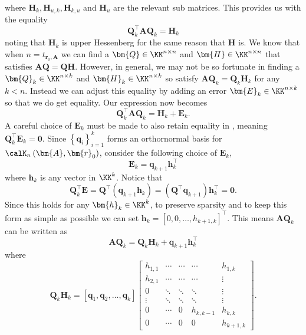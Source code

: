 where $\bm{H}_k , \bm{H}_{u,k}, \bm{H}_{k,u}$ and $\bm{H}_u$ are the relevant sub matrices. This provides us with the equality
\begin{equation}\label{eq: QTkAQk_eq_Hk}
    \bm{Q}_{k}^{\intercal} \bm{A} \bm{Q}_{k} = \bm{H}_k
\end{equation}
noting that $\bm{H}_{k}$ is upper Hessenberg for the same reason that $\bm{H}$ is. We know that when $n = t_{\bm{r}_0, \bm{A}}$ we can find a $\bm{Q} \in \KK^{n \times n}$ and $\bm{H} \in \KK^{n \times n}$ that satisfies $\bm{A} \bm{Q} = \bm{Q} \bm{H}$. However, in general, we may not be so fortunate in finding a $\bm{Q}_{k} \in \KK^{n \times k}$ and $\bm{H}_{k} \in \KK^{n \times k}$ so satisfy $\bm{A} \bm{Q}_{k} = \bm{Q}_{k} \bm{H}_k$ for any $k < n$. Instead we can adjust this equality by adding an error $\bm{E}_k \in \KK^{n \times k}$ so that we do get equality. Our expression now becomes
\begin{equation}\label{eq: QTkAQk_eq_HkEk}
    \bm{Q}_{k}^{\intercal} \bm{A} \bm{Q}_{k} = \bm{H}_k + \bm{E}_k.
\end{equation}
A careful choice of $\bm{E}_k$ must be made to also retain equality in , meaning $\bm{Q}_{k}^{\intercal} \bm{E}_k = \bm{0}$. Since $\left\{ \bm{q}_i \right\}_{i=1}^{k}$ forms an orthornormal basis for $\calK_{n} \left( \bm{A}, \bm{r}_0 \right)$, consider the following choice of $\bm{E}_k$,
\[
    \bm{E}_k = \bm{q}_{k+1} \bm{h}_{k}^{\intercal}
\]
where $\bm{h}_k$ is any vector in $\KK^{k}$. Notice that
\[
    \bm{Q}_{k}^{\intercal} \bm{E} = \bm{Q}^{\intercal} \left( \bm{q}_{k+1} \bm{h}_k \right) = \left( \bm{Q}^{\intercal} \bm{q}_{k+1} \right) \bm{h}_{k}^{\intercal} = \bm{0}.
\]
Since this holds for any $\bm{h}_k \in \KK^{k}$, to preserve sparsity and to keep this form as simple as possible we can set $\bm{h}_k = \left[ 0,0, \ldots , h_{k+1,k} \right]^{\intercal}$. This means $\bm{A} \bm{Q}_k$ can be written as
\begin{equation}\label{eq: QTkAQk_eq_Hk_p_qkhk}
    \bm{A} \bm{Q}_k =  \bm{Q}_k \bm{H}_k + \bm{q}_{k+1} \bm{h}_{k}^{\intercal}
\end{equation}
where
\[
    \bm{Q}_k \bm{H}_k =
    \left[ \bm{q}_1 , \bm{q}_2 , \ldots , \bm{q}_k \right]
    \begin{bmatrix}
        h_{1,1} & \cdots & \cdots & \cdots    & h_{1,k}   \\
        h_{2,1} & \cdots & \cdots & \cdots    & \vdots    \\
        0       & \ddots & \ddots & \ddots    & \vdots    \\
        \vdots  & \ddots & \ddots & \ddots    & \vdots    \\
        0       & \cdots & 0      & h_{k,k-1} & h_{k,k}   \\
        0       & \cdots & 0      & 0         & h_{k+1,k}
    \end{bmatrix}.
\]
